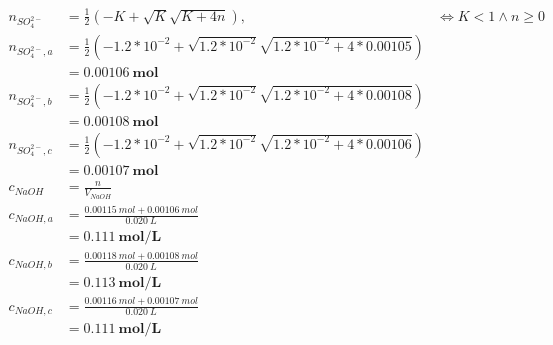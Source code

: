 \documentclass[10pt,twoside]{report}
\begin{document}
\begin{equation*}
    \begin{split}
        n_{SO_4^{2-}} &= \frac{1}{2}(-K + \sqrt{K}\sqrt{K + 4n}), & \iff K < 1 \wedge n \geq 0 \\
        n_{SO_4^{2-},a} &= \frac{1}{2}(-1.2*10^{-2} + \sqrt{1.2*10^{-2}}\sqrt{1.2*10^{-2} + 4*0.00105})\\
            &= \mathbf{0.00106\ mol}\\
        n_{SO_4^{2-},b} &= \frac{1}{2}(-1.2*10^{-2} + \sqrt{1.2*10^{-2}}\sqrt{1.2*10^{-2} + 4*0.00108})\\
            &= \mathbf{0.00108\ mol}\\
        n_{SO_4^{2-},c} &= \frac{1}{2}(-1.2*10^{-2} + \sqrt{1.2*10^{-2}}\sqrt{1.2*10^{-2} + 4*0.00106})\\
            &= \mathbf{0.00107\ mol}\\
        c_{NaOH} &= \frac{n}{V_{NaOH}}\\
        c_{NaOH,a}  &= \frac{0.00115\ mol + 0.00106\ mol}{0.020\ L}\\
            &= \mathbf{0.111\ mol/L}\\
        c_{NaOH,b}  &= \frac{0.00118\ mol + 0.00108\ mol}{0.020\ L}\\
            &= \mathbf{0.113\ mol/L}\\
        c_{NaOH,c} &= \frac{0.00116\ mol + 0.00107\ mol}{0.020\ L}\\
            &= \mathbf{0.111\ mol/L}\\
    \end{split}
\end{equation*}

\newpage
\end{document}
